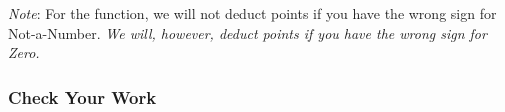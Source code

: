 \begin{description}
\end{description}

\textit{Note}: For the  function, we will not deduct points if you have the wrong sign for Not-a-Number.
\textit{We will, however, deduct points if you have the wrong sign for Zero.}


\subsubsection*{Check Your Work}

\begin{description}
\end{description}

